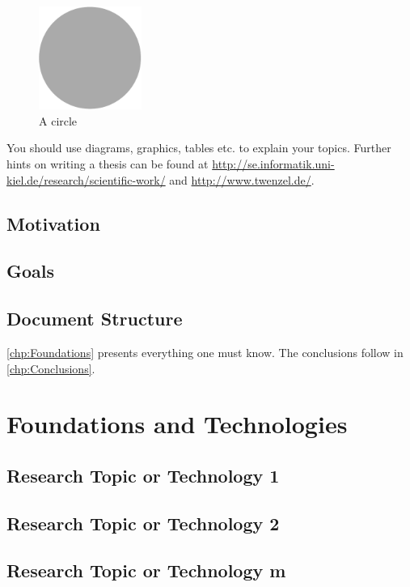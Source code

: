   \begin{figure}[t]%
    \centering%
    \includegraphics[width=0.3\textwidth]{img/template_circle.pdf}%
    \caption{A circle}%
    \label{fig:figure}%
  \end{figure}%

  You should use diagrams, graphics, tables etc. to explain your topics.
  Further hints on writing a thesis can be found at \url{http://se.informatik.uni-kiel.de/research/scientific-work/} and \url{http://www.twenzel.de/}.

  \section{Motivation}
    \blindtext
  \section{Goals}
    \blindtext
  \section{Document Structure}
    \autoref{chp:Foundations} presents everything one must know. The conclusions follow in \autoref{chp:Conclusions}. 

\chapter{Foundations and Technologies}\label{chp:Foundations}
  \section{Research Topic or Technology 1}
    \blindtext
  \section{Research Topic or Technology 2}
    \blindtext
  \section{Research Topic or Technology m}
    \blindtext

